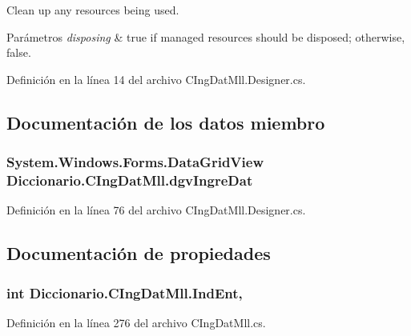 Clean up any resources being used. 


\begin{DoxyParams}{Parámetros}
{\em disposing} & true if managed resources should be disposed; otherwise, false.\\
\hline
\end{DoxyParams}


Definición en la línea 14 del archivo C\-Ing\-Dat\-Mll.\-Designer.\-cs.



\subsection{Documentación de los datos miembro}
\hypertarget{class_diccionario_1_1_c_ing_dat_mll_a3cc1be099bb4784f4eed882f93d2a9cd}{
\subsubsection[{dgv\-Ingre\-Dat}]{\setlength{\rightskip}{0pt plus 5cm}System.\-Windows.\-Forms.\-Data\-Grid\-View Diccionario.\-C\-Ing\-Dat\-Mll.\-dgv\-Ingre\-Dat}}\label{class_diccionario_1_1_c_ing_dat_mll_a3cc1be099bb4784f4eed882f93d2a9cd}


Definición en la línea 76 del archivo C\-Ing\-Dat\-Mll.\-Designer.\-cs.



\subsection{Documentación de propiedades}
\hypertarget{class_diccionario_1_1_c_ing_dat_mll_a3606f18b69846e242aa89b31b6182b7d}{
\subsubsection[{Ind\-Ent}]{\setlength{\rightskip}{0pt plus 5cm}int Diccionario.\-C\-Ing\-Dat\-Mll.\-Ind\-Ent\hspace{0.3cm}{\ttfamily [get]}, {\ttfamily [set]}}}\label{class_diccionario_1_1_c_ing_dat_mll_a3606f18b69846e242aa89b31b6182b7d}


Definición en la línea 276 del archivo C\-Ing\-Dat\-Mll.\-cs.

